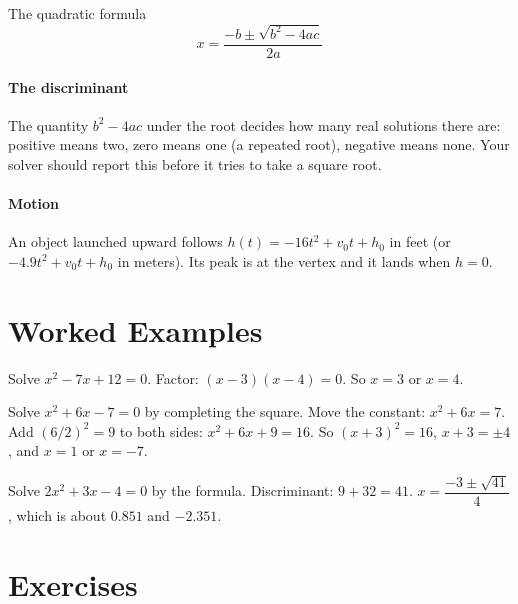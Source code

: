 \begin{keybox}{The quadratic formula}
\[
x = \frac{-b \pm \sqrt{b^2 - 4ac}}{2a}
\]
\end{keybox}

\paragraph{The discriminant} The quantity $b^2 - 4ac$ under the root decides how many real solutions there are: positive means two, zero means one (a repeated root), negative means none. Your solver should report this before it tries to take a square root.

\paragraph{Motion} An object launched upward follows $h(t) = -16t^2 + v_0 t + h_0$ in feet (or $-4.9t^2 + v_0 t + h_0$ in meters). Its peak is at the vertex and it lands when $h = 0$.

\section{Worked Examples}

\begin{example}
Solve $x^2 - 7x + 12 = 0$.
\solution Factor: $(x - 3)(x - 4) = 0$. So $x = 3$ or $x = 4$.
\end{example}

\begin{example}
Solve $x^2 + 6x - 7 = 0$ by completing the square.
\solution Move the constant: $x^2 + 6x = 7$. Add $(6/2)^2 = 9$ to both sides: $x^2 + 6x + 9 = 16$. So $(x + 3)^2 = 16$, $x + 3 = \pm 4$, and $x = 1$ or $x = -7$.
\end{example}

\begin{example}
Solve $2x^2 + 3x - 4 = 0$ by the formula.
\solution Discriminant: $9 + 32 = 41$. $x = \dfrac{-3 \pm \sqrt{41}}{4}$, which is about $0.851$ and $-2.351$.
\end{example}

\section{Exercises}

